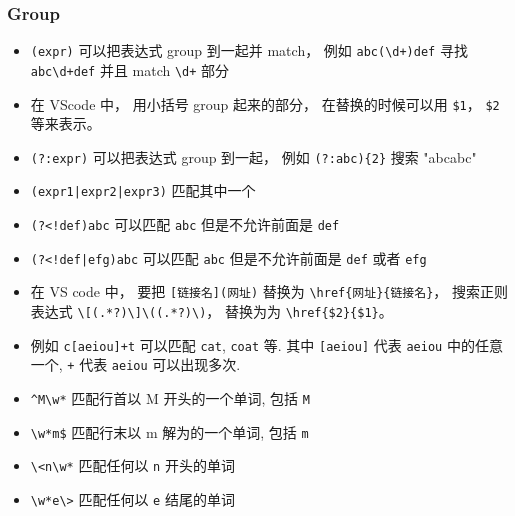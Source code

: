 \subsubsection{Group}
\begin{itemize}
\item \verb|(expr)| 可以把表达式 group 到一起并 match， 例如 \verb|abc(\d+)def| 寻找 \verb|abc\d+def| 并且 match \verb|\d+| 部分
\item 在 VScode 中， 用小括号 group 起来的部分， 在替换的时候可以用 \verb|$1|， \verb|$2| 等来表示。
\item \verb|(?:expr)| 可以把表达式 group 到一起， 例如 \verb|(?:abc){2}| 搜索 "abcabc"
\item \verb`(expr1|expr2|expr3)` 匹配其中一个
\item \verb`(?<!def)abc` 可以匹配 \verb|abc| 但是不允许前面是 \verb|def|
\item \verb`(?<!def|efg)abc` 可以匹配 \verb|abc| 但是不允许前面是 \verb|def| 或者 \verb|efg|
\end{itemize}

\begin{example}{}
\begin{itemize}
\item 在 VS code 中， 要把 \verb|[链接名](网址)| 替换为 \verb|\href{网址}{链接名}|， 搜索正则表达式 \verb|\[(.*?)\]\((.*?)\)|， 替换为为 \verb|\href{$2}{$1}|。
\item 例如 \verb`c[aeiou]+t` 可以匹配 \verb`cat`, \verb`coat` 等. 其中 \verb`[aeiou]` 代表 \verb`aeiou` 中的任意一个, \verb`+` 代表 \verb`aeiou` 可以出现多次.
\item \verb`^M\w*` 匹配行首以 M 开头的一个单词, 包括 \verb`M`
\item \verb`\w*m$` 匹配行末以 m 解为的一个单词, 包括 \verb`m`
\item \verb`\<n\w*` 匹配任何以 \verb`n` 开头的单词
\item \verb`\w*e\>` 匹配任何以 \verb`e` 结尾的单词
\end{itemize}
\end{example}
